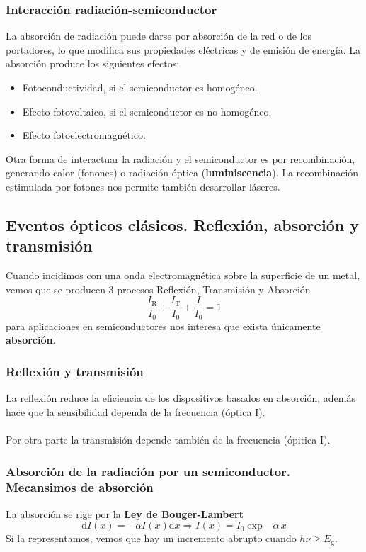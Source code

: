 \subsubsection{Interacción radiación-semiconductor}
\noindent La absorción de radiación puede darse por absorción de la red o de los portadores, lo que modifica sus propiedades eléctricas y de emisión de energía. La absorción produce los siguientes efectos:
\begin{itemize}
    \item Fotoconductividad, si el semiconductor es homogéneo.
    \item Efecto fotovoltaico, si el semiconductor es no homogéneo.
    \item Efecto fotoelectromagnético.
\end{itemize}

Otra forma de interactuar la radiación y el semiconductor es por recombinación, generando calor (fonones) o radiación óptica (\textbf{luminiscencia}). La recombinación estimulada por fotones nos permite también desarrollar láseres.
\subsection{Eventos ópticos clásicos. Reflexión, absorción y transmisión} \label{sec: eventos opticos clasicos}
Cuando incidimos con una onda electromagnética sobre la superficie de un metal, vemos que se producen 3 procesos Reflexión, Transmisión y Absorción $$\frac{I_\mathrm{R}}{I_0}+\frac{I_\mathrm{T}}{I_0}+\frac{I}{I_0}=1$$ para aplicaciones en semiconductores nos interesa que exista únicamente \textbf{absorción}.
\subsubsection{Reflexión y transmisión}
\noindent La reflexión reduce la eficiencia de los dispositivos basados en absorción, además hace que la sensibilidad dependa de la frecuencia (óptica I).
\\\\ \noindent Por otra parte la transmisión depende también de la frecuencia (ópitica I).
\subsubsection{Absorción de la radiación por un semiconductor. Mecansimos de absorción}
La absorción se rige por la \textbf{Ley de Bouger-Lambert} $$\mathrm{d} I(x)=-\alpha I(x) \mathrm{d}x \Rightarrow I(x)=I_0\exp{-\alpha\,x}$$Si la representamos, vemos que hay un incremento abrupto cuando $h\nu \geq E_\mathrm{g}$.

